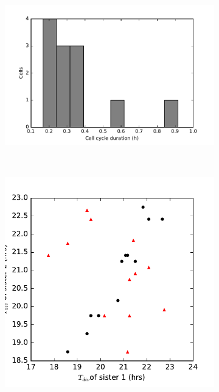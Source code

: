 \documentclass[pdftex,12pt,a4paper]{report}
\begin{document}
\begin{figure}[H]
\centering

\begin{subfigure}{.4\textwidth}
  \centering
  \includegraphics[width=\textwidth]{images/ccd_hist_syn.pdf}
  \caption{}
  \label{fig:ccd_hist_syn}
\end{subfigure}
~
\begin{subfigure}{.4\textwidth}
  \centering
  \includegraphics[width=\textwidth]{images/ccd_scatter_syn.pdf}
  \caption{}
  \label{fig:ccd_scatter_syn}
\end{subfigure}

\end{figure}
\end{document}
